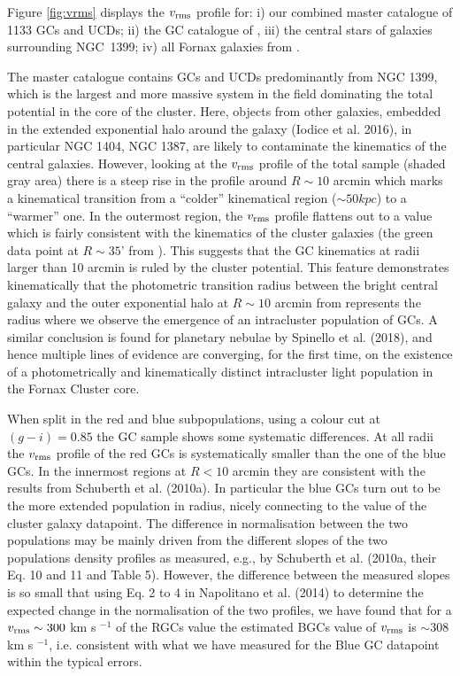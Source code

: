 \documentclass[useAMS,usenatbib]{mn2e}
\begin{document}
Figure \ref{fig:vrms} displays the $v_{\rm rms}$ profile for: i) our combined 
master catalogue of 1133 GCs and UCDs; ii) the GC catalogue of 
\citet{Schuberth}, iii) the central stars of galaxies surrounding NGC~1399; iv) 
all Fornax galaxies from \citet{Drinkwater00}. 

The master catalogue contains GCs and UCDs predominantly from NGC 1399, which 
is the largest and more massive system in the field dominating the total 
potential in the core of the cluster. Here, objects from other galaxies, 
embedded in the extended exponential halo around the galaxy (Iodice et al. 
2016), in particular NGC 1404, NGC 1387, are likely to contaminate the 
kinematics of the central galaxies. However, looking at the $v_{\rm rms}$ 
profile of the total sample (shaded gray area) there is a steep rise in the 
profile around $R\sim10$ arcmin which marks a kinematical transition from a 
``colder'' kinematical region ($\sim 50 kpc$) to a ``warmer'' one. In the 
outermost region, the $v_{\rm rms}$ profile flattens out to a value which is 
fairly consistent with the kinematics of the cluster galaxies (the green data 
point at $R\sim35’$ from \citealt{Drinkwater00}). This suggests that the GC 
kinematics at radii larger than 10 arcmin is ruled by the cluster potential. 
This feature demonstrates kinematically that the photometric transition radius 
between the bright central galaxy and the outer exponential halo at $R\sim10$ 
arcmin from \citet{Iodice16} represents the radius where we observe the 
emergence of an intracluster population of GCs. A similar conclusion is found 
for planetary nebulae by Spinello et al. (2018), and hence multiple lines of 
evidence are converging, for the first time, on the existence of a 
photometrically and kinematically distinct intracluster light population in the 
Fornax Cluster core.

When split in the red and blue subpopulations, using a colour cut at $(g - i) = 0.85$ 
the GC sample shows some systematic differences. At all radii the $v_{\rm rms}$ 
profile of the red GCs is systematically smaller than the one of the blue GCs.  
In the innermost regions at $R < 10$ arcmin they are consistent with the 
results from Schuberth et al. (2010a). In particular the blue GCs turn out to 
be the more extended population in radius, nicely connecting to the value of 
the cluster galaxy datapoint. The difference in normalisation between the two 
populations may be mainly driven from the different slopes of the two 
populations density profiles as measured, e.g., by Schuberth et al. (2010a, 
their Eq. 10 and 11 and Table 5). However, the difference between the measured 
slopes is so small that using Eq. 2 to 4 in Napolitano et al. (2014) to 
determine the expected change in the normalisation of the two profiles, we have 
found that for a $v_{\rm rms} \sim 300$ km s $^{-1}$ of the RGCs value the 
estimated BGCs value of $v_{\rm rms}$ is $\sim 308$ km s $^{-1}$, i.e. 
consistent with what we have measured for the Blue GC datapoint within the 
typical errors.
\end{document}
